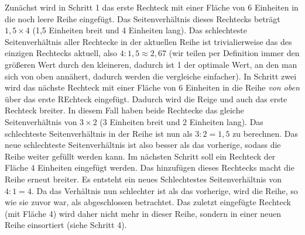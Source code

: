 Zunächst wird in Schritt 1 das erste Rechteck mit einer Fläche von 6 Einheiten in die noch leere Reihe eingefügt. Das Seitenverhältnis dieses Rechtecks beträgt $1,5 \times 4$ (1,5 Einheiten breit und 4 Einheiten lang). Das schlechteste Seitenverhältnis aller Rechtecke in der aktuellen Reihe ist trivialierweise das des einzigen Rechtecks aktuell, also $4 : 1,5 \approx 2,67$ (wir teilen per Definition immer den größeren Wert durch den kleineren, dadurch ist 1 der optimale Wert, an den man sich von oben annähert, dadurch werden die vergleiche einfacher).
In Schritt zwei wird das nächste Rechteck mit einer Fläche von 6 Einheiten in die Reihe \textit{von oben} über das erste REchteck eingefügt. Dadurch wird die Reige und auch das erste Rechteck breiter. In diesem Fall haben beide Rechtecke das gleiche Seitenverhältnis von $3 \times 2$ (3 Einheiten breit und 2 Einheiten lang). Das schlechteste Seitenverhältnis in der Reihe ist nun als $3 : 2 = 1,5$ zu berechnen. Das neue schlechteste Seitenverhältnis ist also besser als das vorherige, sodass die Reihe weiter gefüllt werden kann.
Im nächsten Schritt soll ein Rechteck der Fläche 4 Einheiten eingefügt werden. Das hinzufügen dieses Rechtecks macht die Reihe erneut breiter. Es entsteht ein neues Schlechtestes Seitenverhältnis von $4 : 1 = 4$. Da das Verhältnis nun schlechter ist als das vorherige, wird die Reihe, so wie sie zuvor war, als abgeschlossen betrachtet. Das zuletzt eingefügte Rechteck (mit Fläche 4) wird daher nicht mehr in dieser Reihe, sondern in einer neuen Reihe einsortiert (siehe Schritt 4). 

